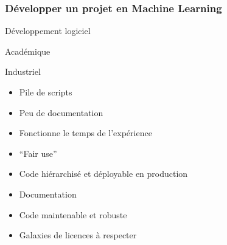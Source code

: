 \documentclass{formation}
\begin{document}
\begin{frame}
  \frametitle{Développer un projet en Machine Learning}
  \begin{center}
    Développement logiciel
  \end{center}
  \begin{minipage}[c]{0.49\linewidth}
    \begin{center}
      Académique
      \newline
    \end{center}
  \end{minipage}\hfill
  \begin{minipage}[c]{0.49\linewidth}
    \begin{center}
      Industriel
      \newline
    \end{center}
  \end{minipage}\hfill
  \begin{minipage}[c]{0.49\linewidth}
    \begin{itemize}
    \item Pile de scripts
    \item Peu de documentation
    \item Fonctionne le temps de l'expérience
      \item ``Fair use''
    \end{itemize}
  \end{minipage}\hfill
  \vrule{}
  \begin{minipage}[c]{0.49\linewidth}
    \begin{itemize}
    \item Code hiérarchisé et déployable en production
    \item Documentation
    \item Code maintenable et robuste
    \item Galaxies de licences à respecter
    \end{itemize}
  \end{minipage}\hfill
\end{frame}
\end{document}
